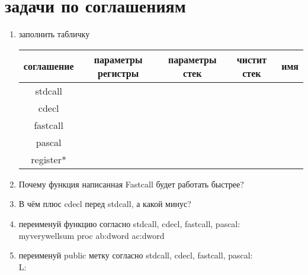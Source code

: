 \documentclass[a4paper,10pt]{article}
\begin{document}
\section*{задачи по соглашениям}
\begin{enumerate}
    \item заполнить табличку \\
    \begin{tabular}{|c|c|c|c|c|}
        \hline
        соглашение & параметры регистры & параметры стек & чистит стек & имя \\
        \hline
        stdcall & & & & \\
        \hline
        cdecl & & & & \\
        \hline
        fastcall & & & & \\
        \hline
        pascal & & & & \\
        \hline
        register* & & & & \\
        \hline
    \end{tabular}
    \item Почему функция написанная Fastcall будет работать быстрее?
    \item В чём плюс cdecl перед stdcall, а какой минус?
    \item переименуй функцию согласно stdcall, cdecl, fastcall, pascal: \\
    myverywellsum proc ab:dword ac:dword
    \item переименуй public метку согласно stdcall, cdecl, fastcall, pascal: \\
    L: \\
\end{enumerate}
\end{document}
